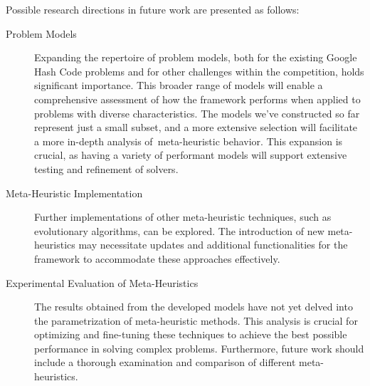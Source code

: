 Possible research directions in future work are presented as follows:

\begin{description}
  \item[Problem Models] Expanding the repertoire of problem models, both for
    the existing Google Hash Code problems and for other challenges within the
    competition, holds significant importance. This broader range of models will
    enable a comprehensive assessment of how the framework performs when applied
    to problems with diverse characteristics. The models we've constructed so far
    represent just a small subset, and a more extensive selection will facilitate
    a more in-depth analysis of~\acrshort{meta-heuristic} behavior. This expansion is
    crucial, as having a variety of performant models will support extensive
    testing and refinement of solvers.

  \item[Meta-Heuristic Implementation] Further implementations of other
    meta-heuristic techniques, such as evolutionary algorithms, can be
    explored. The introduction of new meta-heuristics may necessitate updates
    and additional functionalities for the framework to accommodate these approaches effectively.

  \item[Experimental Evaluation of Meta-Heuristics] The results obtained from the
    developed models have not yet delved into the parametrization of meta-heuristic
    methods. This analysis is crucial for optimizing and fine-tuning these
    techniques to achieve the best possible performance in solving complex problems.
    Furthermore, future work should include a thorough examination and comparison
    of different  meta-heuristics.
\end{description}